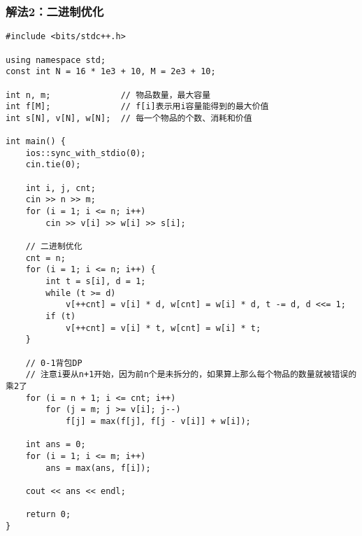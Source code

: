     \subsubsection{解法2：二进制优化}
\begin{lstlisting}
#include <bits/stdc++.h>

using namespace std;
const int N = 16 * 1e3 + 10, M = 2e3 + 10;

int n, m;              // 物品数量，最大容量
int f[M];              // f[i]表示用i容量能得到的最大价值
int s[N], v[N], w[N];  // 每一个物品的个数、消耗和价值

int main() {
    ios::sync_with_stdio(0);
    cin.tie(0);

    int i, j, cnt;
    cin >> n >> m;
    for (i = 1; i <= n; i++)
        cin >> v[i] >> w[i] >> s[i];

    // 二进制优化
    cnt = n;
    for (i = 1; i <= n; i++) {
        int t = s[i], d = 1;
        while (t >= d)
            v[++cnt] = v[i] * d, w[cnt] = w[i] * d, t -= d, d <<= 1;
        if (t)
            v[++cnt] = v[i] * t, w[cnt] = w[i] * t;
    }

    // 0-1背包DP
    // 注意i要从n+1开始，因为前n个是未拆分的，如果算上那么每个物品的数量就被错误的乘2了
    for (i = n + 1; i <= cnt; i++)
        for (j = m; j >= v[i]; j--)
            f[j] = max(f[j], f[j - v[i]] + w[i]);

    int ans = 0;
    for (i = 1; i <= m; i++)
        ans = max(ans, f[i]);

    cout << ans << endl;

    return 0;
}
\end{lstlisting}
